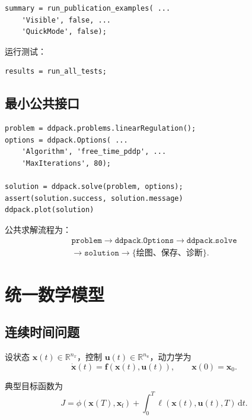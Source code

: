 \documentclass[UTF8,zihao=-4,openany,fontset=fandol]{ctexbook}
\newcommand{\R}{\mathbb{R}}
\begin{document}
\begin{lstlisting}
summary = run_publication_examples( ...
    'Visible', false, ...
    'QuickMode', false);
\end{lstlisting}

运行测试：

\begin{lstlisting}
results = run_all_tests;
\end{lstlisting}

\section{最小公共接口}

\begin{lstlisting}
problem = ddpack.problems.linearRegulation();
options = ddpack.Options( ...
    'Algorithm', 'free_time_pddp', ...
    'MaxIterations', 80);

solution = ddpack.solve(problem, options);
assert(solution.success, solution.message)
ddpack.plot(solution)
\end{lstlisting}

公共求解流程为：
\begin{equation*}
  \begin{gathered}
    \texttt{problem}
    \longrightarrow
    \texttt{ddpack.Options}
    \longrightarrow
    \texttt{ddpack.solve}
    \\[-1mm]
    \longrightarrow
    \texttt{solution}
    \longrightarrow
    \{\text{绘图、保存、诊断}\}.
  \end{gathered}
\end{equation*}

\chapter{统一数学模型}

\section{连续时间问题}

设状态 $\bm{x}(t)\in\R^{n_x}$，控制 $\bm{u}(t)\in\R^{n_u}$，动力学为
\begin{equation}
  \dot{\bm{x}}(t)=\bm{f}(\bm{x}(t),\bm{u}(t)),
  \qquad
  \bm{x}(0)=\bm{x}_0 .
\end{equation}

典型目标函数为
\begin{equation}
  J=
  \phi\!\left(\bm{x}(T),\bm{x}_{\mathrm f}\right)
  +\int_0^T
  \ell\!\left(\bm{x}(t),\bm{u}(t),T\right)\,\mathrm dt .
\end{equation}
\end{document}
